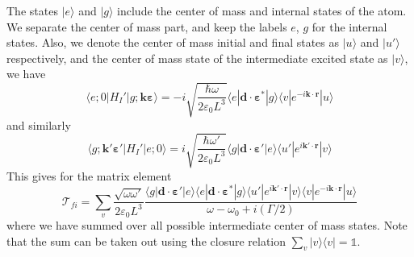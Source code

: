 \documentclass[11pt,letter]{article}
\newcommand{\bv}[1]{\ensuremath{\bm{#1}}}
\begin{document}
The states $|e\rangle$ and $|g\rangle$ include the center of mass and internal
states of the atom.  We separate the center of mass part, and keep the labels
$e$, $g$ for the internal states. Also, we denote the center of mass initial
and final states as $| u \rangle$ and $|u'\rangle$ respectively, and the center
of mass state of the intermediate excited state as $| v\rangle$, we have
\begin{equation}
   \langle e; 0 | H_{I}' | g; \bv{k}\bv{\varepsilon} \rangle = 
       -i \sqrt{ \frac{ \hbar \omega }{2 \varepsilon_{0} L^{3} }} 
      \langle e | \bv{d} \cdot \bv{\varepsilon}^{*} | g \rangle 
      \langle v | e^{-i\bv{k}\cdot\bv{r}} | u \rangle
\end{equation}
and similarly
\begin{equation}
   \langle g; \bv{k}'\bv{\varepsilon}' | H_{I}' | e; 0\rangle = 
       i \sqrt{ \frac{ \hbar \omega' }{2 \varepsilon_{0} L^{3} }} 
      \langle g | \bv{d} \cdot \bv{\varepsilon}' | e \rangle 
      \langle u' | e^{i\bv{k}'\cdot\bv{r}} | v \rangle
\end{equation}
This gives for the matrix element
\begin{equation}
    \mathcal{T}_{fi} = \sum_{v} \frac{\sqrt{\omega \omega'}}
                                     {2\varepsilon_{0} L^{3}}
    \frac{ 
      \langle g | \bv{d} \cdot \bv{\varepsilon}' | e \rangle 
      \langle e | \bv{d} \cdot \bv{\varepsilon}^{*} | g \rangle 
      \langle u'| e^{i\bv{k}'\cdot\bv{r}} | v \rangle 
      \langle v | e^{-i\bv{k}\cdot\bv{r}} | u  \rangle
       }
        { \omega - \omega_{0} + i (\Gamma/2 ) }
\end{equation}
where we have summed over all possible intermediate center of mass states.
Note that the sum can be taken out using the closure relation
$\sum_{v}|v\rangle\langle v| = \mathbb{1}$. 
\end{document}

